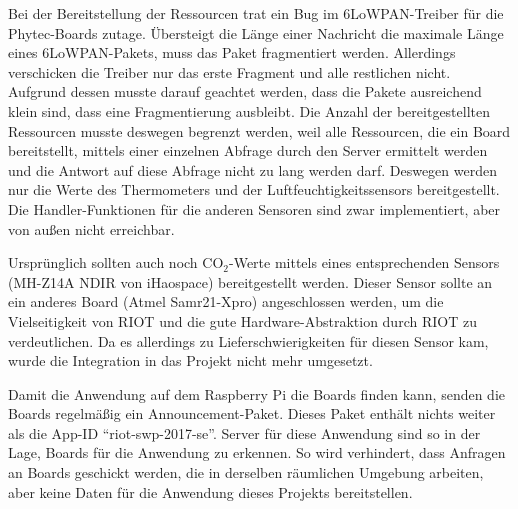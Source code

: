 \documentclass[a4paper]{article}
\begin{document}
Bei der Bereitstellung der Ressourcen trat ein Bug im 6LoWPAN-Treiber für die Phytec-Boards zutage. Übersteigt die Länge einer Nachricht die maximale Länge eines 6LoWPAN-Pakets, muss das Paket fragmentiert werden. Allerdings verschicken die Treiber nur das erste Fragment und alle restlichen nicht. Aufgrund dessen musste darauf geachtet werden, dass die Pakete ausreichend klein sind, dass eine Fragmentierung ausbleibt. Die Anzahl der bereitgestellten Ressourcen musste deswegen begrenzt werden, weil alle Ressourcen, die ein Board bereitstellt, mittels einer einzelnen Abfrage durch den Server ermittelt werden und die Antwort auf diese Abfrage nicht zu lang werden darf. Deswegen werden nur die Werte des Thermometers und der Luftfeuchtigkeitssensors bereitgestellt. Die Handler-Funktionen für die anderen Sensoren sind zwar implementiert, aber von außen nicht erreichbar.

Ursprünglich sollten auch noch $\text{CO}_{2}$-Werte mittels eines entsprechenden Sensors (MH-Z14A NDIR von iHaospace) bereitgestellt werden. Dieser Sensor sollte an ein anderes Board (Atmel Samr21-Xpro) angeschlossen werden, um die Vielseitigkeit von RIOT und die gute Hardware-Abstraktion durch RIOT zu verdeutlichen. Da es allerdings zu Lieferschwierigkeiten für diesen Sensor kam, wurde die Integration in das Projekt nicht mehr umgesetzt.

Damit die Anwendung auf dem Raspberry Pi die Boards finden kann, senden die Boards regelmäßig ein Announcement-Paket. Dieses Paket enthält nichts weiter als die App-ID \enquote{riot-swp-2017-se}. Server für diese Anwendung sind so in der Lage, Boards für die Anwendung zu erkennen. So wird verhindert, dass Anfragen an Boards geschickt werden, die in derselben räumlichen Umgebung arbeiten, aber keine Daten für die Anwendung dieses Projekts bereitstellen.
\end{document}
